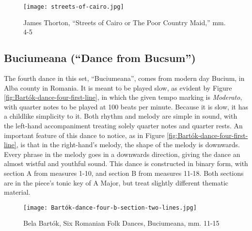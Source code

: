 \begin{figure}
  \centering
  \texttt{[image: streets-of-cairo.jpg]}
  \caption{James Thorton, ``Streets of Cairo or The Poor Country Maid,'' mm. 4-5}
  \label{fig:thorton-streets-of-cairo}
\end{figure}



\subsection{Buciumeana (``Dance from Bucsum'')}

The fourth dance in this set, ``Buciumeana'', comes from modern day Bucium, in Alba county in Romania. It is meant to be played slow, as evident by Figure \ref{fig:Bartók-dance-four-first-line}\autocite{Lung_2016}, in which the given tempo marking is \textit{Moderato}, with quarter notes to be played at 100 beats per minute. Because it is slow, it has a childlike simplicity to it. Both rhythm and melody are simple in sound, with the left-hand accompaniment treating solely quarter notes and quarter rests. An important feature of this dance to notice, as in Figure \ref{fig:Bartók-dance-four-first-line}\autocite{Lung_2016}, is that in the right-hand's melody, the shape of the melody is downwards. Every phrase in the melody goes in a downwards direction, giving the dance an almost wistful and youthful sound. This dance is constructed in binary form, with section A from measures 1-10, and section B from measures 11-18. Both sections are in the piece's tonic key of A Major, but treat slightly different thematic material. 

\begin{figure}
  \centering
  \texttt{[image: Bartók-dance-four-b-section-two-lines.jpg]}
  \caption{Bela Bartók, Six Romanian Folk Dances, Buciumeana, mm. 11-15}
  \label{fig:Bartók-dance-four-b-section-two-lines}
\end{figure}

